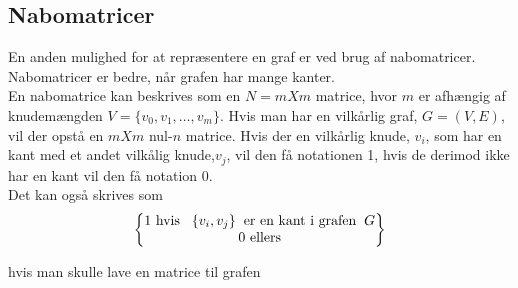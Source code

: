 \subsection{Nabomatricer}
En anden mulighed for at repræsentere en graf er ved brug af nabomatricer. Nabomatricer er bedre, når grafen har mange kanter.\\
En nabomatrice kan beskrives som en $N=m X m$ matrice, hvor $m$ er afhængig af knudemængden $V=\{v_0, v_1, \ldots, v_m\}$. Hvis man har en vilkårlig graf, $G=(V,E)$, vil der opstå en $m X m$ nul-$n$ matrice. Hvis der en vilkårlig knude, $v_i$, som har en kant med et andet vilkålig knude,$v_j$, vil den få notationen 1, hvis de derimod ikke har en kant vil den få notation 0. \\

Det kan også skrives som \\

\begin{equation}
\begin{Bmatrix} 
	 \textrm{1 hvis} \hspace{0.3cm}\{v_i,v_j\} \hspace{0.2cm} \textrm{er en kant i grafen} \hspace{0.2cm} G \\
	 \textrm{0 ellers} \\
	\end{Bmatrix}
\end{equation}

hvis man skulle lave en matrice til grafen  

	

